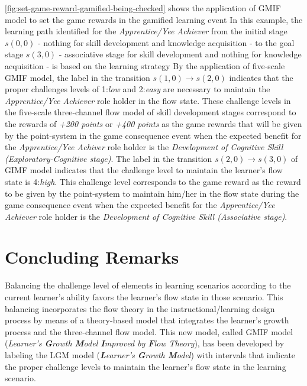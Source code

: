 \autoref{fig:set-game-reward-gamified-being-checked} shows the application of GMIF model to set the game rewards in the gamified learning event  In this example, the learning path identified for the \emph{Apprentice/Yee Achiever} from the initial stage $s(0,0)$ - nothing for skill development and knowledge acquisition -  to the goal stage $s(3,0)$ - associative stage for skill development and nothing for knowledge acquisition - is based on the learning strategy  By the application of five-scale GMIF model, the label 
\aspas{$[1;2]$} in the transition $s(1,0) \to s(2,0)$ indicates that the proper challenges levels of 1:\emph{low} and 2:\emph{easy} are necessary to maintain the \emph{Apprentice/Yee Achiever} role holder in the flow state. These challenge levels in the five-scale three-channel flow model of skill development stages correspond to the rewards of \emph{+200 points} or \emph{+400 points} as the game rewards that will be given by the point-system in the game consequence event when the expected benefit for the \emph{Apprentice/Yee Achiver} role holder is the \emph{Development of Cognitive Skill (Exploratory-Cognitive stage)}. The label \aspas{$[3;3]$} in the transition $s(2,0) \to s(3,0)$ of GIMF model indicates that the challenge level to maintain the learner's flow state is 4:\emph{high}. This challenge level corresponds to the game reward  as the reward to be given by the point-system to maintain him/her in the flow state during the game consequence event when the expected benefit for the \emph{Apprentice/Yee Achiever} role holder is the \emph{Development of Cognitive Skill (Associative stage)}.

\section{Concluding Remarks}
\label{sec:model-gmif-concluding-remarks} 

Balancing the challenge level of elements in learning scenarios according to the current learner's ability favors the learner's flow state in those scenario. This balancing incorporates the flow theory in the instructional/learning design process by means of a theory-based model that integrates the learner's growth process and the three-channel flow model. This new model, called GMIF model (\emph{Learner's \textbf{G}rowth \textbf{M}odel \textbf{I}mproved by \textbf{F}low Theory}), has been developed by labeling the LGM model (\emph{\textbf{L}earner's \textbf{G}rowth \textbf{M}odel}) with intervals that indicate the proper challenge levels to maintain the learner's flow state in the learning scenario.

